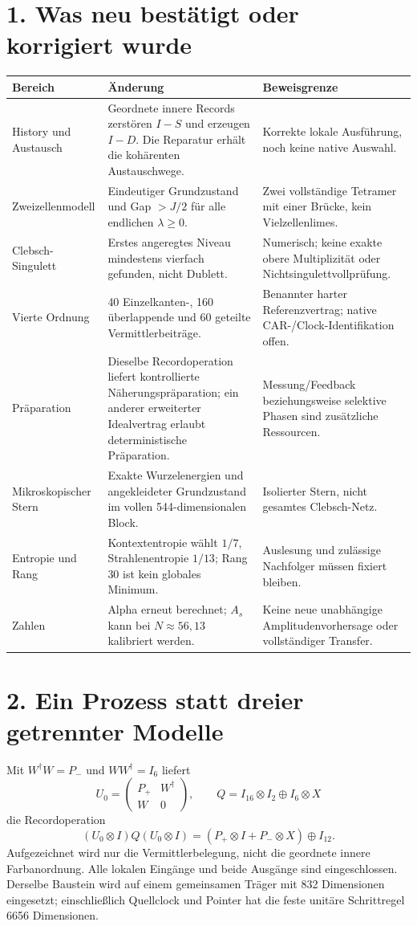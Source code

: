 \documentclass[11pt,a4paper,oneside,parskip=half,headings=normal]{scrreprt}
\begin{document}
\section*{1. Was neu bestätigt oder korrigiert wurde}
\begin{longtable}{L{39mm}L{61mm}L{50mm}}
\toprule Bereich&Änderung&Beweisgrenze\\\midrule\endhead
History und Austausch&Geordnete innere Records zerstören $I-S$ und erzeugen $I-D$. Die Reparatur erhält die kohärenten Austauschwege.&Korrekte lokale Ausführung, noch keine native Auswahl.\\
Zweizellenmodell&Eindeutiger Grundzustand und Gap $>J/2$ für alle endlichen $\lambda\ge0$.&Zwei vollständige Tetramer mit einer Brücke, kein Vielzellenlimes.\\
Clebsch-Singulett&Erstes angeregtes Niveau mindestens vierfach gefunden, nicht Dublett.&Numerisch; keine exakte obere Multiplizität oder Nichtsingulettvollprüfung.\\
Vierte Ordnung&40 Einzelkanten-, 160 überlappende und 60 geteilte Vermittlerbeiträge.&Benannter harter Referenzvertrag; native CAR-/Clock-Identifikation offen.\\
Präparation&Dieselbe Recordoperation liefert kontrollierte Näherungspräparation; ein anderer erweiterter Idealvertrag erlaubt deterministische Präparation.&Messung/Feedback beziehungsweise selektive Phasen sind zusätzliche Ressourcen.\\
Mikroskopischer Stern&Exakte Wurzelenergien und angekleideter Grundzustand im vollen 544-dimensionalen Block.&Isolierter Stern, nicht gesamtes Clebsch-Netz.\\
Entropie und Rang&Kontextentropie wählt $1/7$, Strahlenentropie $1/13$; Rang 30 ist kein globales Minimum.&Auslesung und zulässige Nachfolger müssen fixiert bleiben.\\
Zahlen&Alpha erneut berechnet; $A_s$ kann bei $N\approx56{,}13$ kalibriert werden.&Keine neue unabhängige Amplitudenvorhersage oder vollständiger Transfer.\\\bottomrule
\end{longtable}

\section*{2. Ein Prozess statt dreier getrennter Modelle}
Mit $W^\dagger W=P_-$ und $WW^\dagger=I_6$ liefert
\begin{equation}
U_0=\begin{pmatrix}P_+&W^\dagger\\W&0\end{pmatrix},\qquad
Q=I_{16}\otimes I_2\oplus I_6\otimes X
\end{equation}
die Recordoperation
\begin{equation}
(U_0\otimes I)Q(U_0\otimes I)
=(P_+\otimes I+P_-\otimes X)\oplus I_{12}.
\end{equation}
Aufgezeichnet wird nur die Vermittlerbelegung, nicht die geordnete innere Farbanordnung. Alle lokalen Eingänge und beide Ausgänge sind eingeschlossen. Derselbe Baustein wird auf einem gemeinsamen Träger mit 832 Dimensionen eingesetzt; einschließlich Quellclock und Pointer hat die feste unitäre Schrittregel 6656 Dimensionen.
\end{document}
